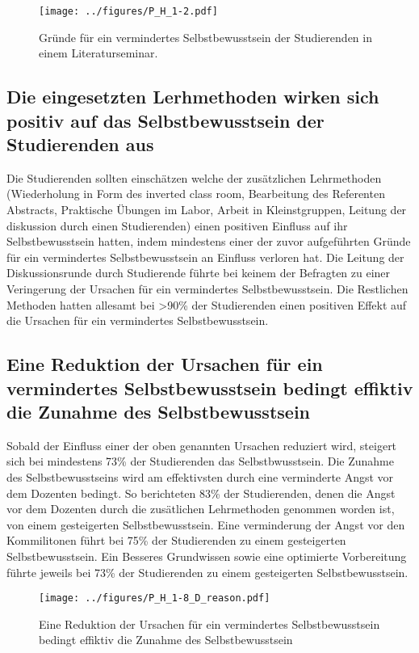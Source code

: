 \begin{figure}[h!]
\begin{center}
	\texttt{[image: ../figures/P\_H\_1-2.pdf]}
\end{center}
	\caption{Gründe für ein vermindertes Selbstbewusstsein der Studierenden in einem Literaturseminar.}
\end{figure}

\subsection{Die eingesetzten Lerhmethoden wirken sich positiv auf das Selbstbewusstsein der Studierenden aus}
Die Studierenden sollten einschätzen welche der  zusätzlichen Lehrmethoden (Wiederholung in Form des inverted class room, Bearbeitung des Referenten Abstracts, Praktische Übungen im Labor, Arbeit in Kleinstgruppen, Leitung der diskussion durch einen Studierenden) einen positiven Einfluss auf ihr Selbstbewusstsein hatten, indem mindestens einer der zuvor aufgeführten Gründe für ein vermindertes Selbstbewusstsein an Einfluss verloren hat. Die Leitung der Diskussionsrunde durch Studierende führte bei keinem der Befragten zu einer Veringerung der Ursachen für ein vermindertes Selbstbewusstsein. Die Restlichen Methoden hatten allesamt bei >90\% der Studierenden einen positiven Effekt auf die Ursachen für ein vermindertes Selbstbewusstsein.

\subsection{Eine Reduktion der Ursachen für ein vermindertes Selbstbewusstsein bedingt effiktiv die Zunahme des Selbstbewusstsein}
Sobald der Einfluss einer der oben genannten Ursachen reduziert wird, steigert sich bei mindestens 73\% der Studierenden das Selbstbwusstsein. Die Zunahme des Selbstbewusstseins wird am effektivsten durch eine verminderte Angst vor dem Dozenten bedingt. So berichteten 83\% der Studierenden, denen die Angst vor dem Dozenten durch die zusätlichen Lehrmethoden genommen worden ist, von einem gesteigerten Selbstbewusstsein. Eine verminderung der Angst vor den Kommilitonen führt bei 75\% der Studierenden zu einem gesteigerten Selbstbewusstsein. Ein Besseres Grundwissen sowie eine optimierte Vorbereitung führte jeweils bei 73\% der Studierenden zu einem gesteigerten Selbstbewusstsein.
\begin{figure}[h!]
\begin{center}
	\texttt{[image: ../figures/P\_H\_1-8\_D\_reason.pdf]}
\end{center}
	\caption{Eine Reduktion der Ursachen für ein vermindertes Selbstbewusstsein bedingt effiktiv die Zunahme des Selbstbewusstsein}
\end{figure}


